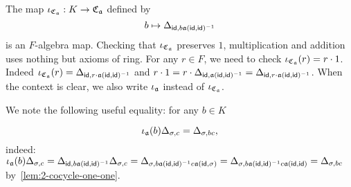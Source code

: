 \begin{construction}[$K$-embedding]\label{con:cross-product-iota}
  The map $\iota_{\operatorname{\mathfrak{C}}_{\mathfrak{a}}}: K \to \operatorname{\mathfrak{C}}_{\mathfrak{a}}$ defined by
  \[
    b \mapsto \Delta_{\mathsf{id}, b\mathfrak{a}(\mathsf{id},\mathsf{id})^{-1}}
  \]
  is an $F$-algebra map.
  Checking that $\iota_{\operatorname{\mathfrak{C}}_{\mathfrak{a}}}$ preserves $1$, multiplication and addition uses nothing but axioms of ring.
  For any $r \in F$, we need to check $\iota_{\operatorname{\mathfrak{C}}_{\mathfrak{a}}}(r) = r \cdot 1$. Indeed $\iota_{\operatorname{\mathfrak{C}}_{\mathfrak{a}}}(r) = \Delta_{\mathsf{id}, r\cdot \mathfrak{a}(\mathsf{id},\mathsf{id})^{-1}}$ and $r\cdot 1 = r \cdot \Delta_{\mathsf{id},\mathfrak{a}(\mathsf{id},\mathsf{id})^{-1}} =\Delta_{\mathsf{id},r\cdot\mathfrak{a}(\mathsf{id},\mathsf{id})^{-1}}$.
  When the context is clear, we also write $\iota_{\mathfrak{a}}$ instead of $\iota_{\operatorname{\mathfrak{C}}_{\mathfrak{a}}}$.

  We note the following useful equality: for any $b \in K$

  \[
    \iota_{\mathfrak{a}}(b)\Delta_{\sigma, c} = \Delta_{\sigma, bc},
  \]
  indeed:
  $\iota_{\mathfrak{a}}(b)\Delta_{\sigma, c} = \Delta_{\mathsf{id},b \mathfrak{a}(\mathsf{id},\mathsf{id})^{-1}}\Delta_{\sigma, c} = \Delta_{\sigma, b\mathfrak{a}(\mathsf{id},\mathsf{id})^{-1}c\mathfrak{a}(\mathsf{id},\sigma)} = \Delta_{\sigma,b\mathfrak{a}(\mathsf{id},\mathsf{id})^{-1}c\mathfrak{a}(\mathsf{id},\mathsf{id})} = \Delta_{\sigma, bc}$ by~\cref{lem:2-cocycle-one-one}.
  \leanok
\end{construction}

